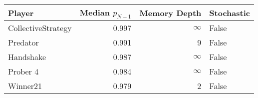 \begin{tabular}{lrrl}
\toprule
             Player &  Median $p_{N-1}$ &  Memory Depth & Stochastic \\
\midrule
 CollectiveStrategy &             0.997 &            \(\infty\) &      False \\
           Predator &             0.991 &             9 &      False \\
          Handshake &             0.987 &            \(\infty\) &      False \\
           Prober 4 &             0.984 &            \(\infty\) &      False \\
           Winner21 &             0.979 &             2 &      False \\
\bottomrule
\end{tabular}
